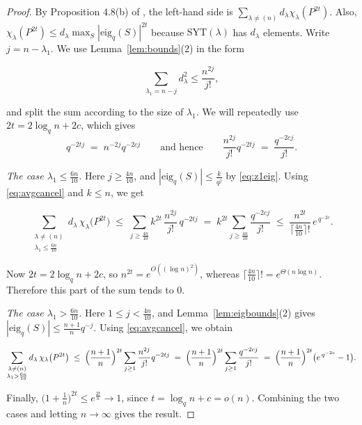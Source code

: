 \documentclass[11pt]{article}
\theoremstyle{plain}  %
\newcommand{\eig}{\text{eig}} %
\begin{document}
\begin{proof}
By Proposition 4.8(b) of \cite{DiaconisRam2000}, the left-hand side is
$\sum_{\lambda \ne (n)} d_\lambda \chi_\lambda(P^{2t})$. Also,
$\chi_\lambda(P^{2t}) \le d_\lambda \max_S |\eig_q(S)|^{2t}$ because
$\mathrm{SYT}(\lambda)$ has $d_\lambda$ elements. Write $j = n-\lambda_1$.
We use Lemma~\ref{lem:bounds}(2) in the form

$$\sum_{\lambda_1 = n-j} d_\lambda^{2} \le \frac{n^{2j}}{j!},
$$

and split the sum according to the size of $\lambda_1$. We will repeatedly use
$2t = 2\log_q n + 2c$, which gives
\begin{equation}\label{eq:avgcancel}
q^{-2tj} \;=\; n^{-2j}q^{-2cj}
\qquad\text{and hence}\qquad
\frac{n^{2j}}{j!}q^{-2tj} \;=\; \frac{q^{-2cj}}{j!} .
\end{equation}

\emph{The case $\lambda_1 \le \frac{6n}{10}$.} Here $j \ge \frac{4n}{10}$, and
$|\eig_q(S)| \le \frac{k}{q^{j}}$ by \eqref{eq:z1eig}. Using \eqref{eq:avgcancel}
and $k \le n$, we get

$$
  \sum_{\substack{\lambda \ne (n) \\ \lambda_1 \le \frac{6n}{10}}}
  d_\lambda\,\chi_\lambda\bigl(P^{2t}\bigr)
  \;\le\; \sum_{j \ge \frac{4n}{10}} k^{2t}\,\frac{n^{2j}}{j!}\,q^{-2tj}
  \;=\; k^{2t}\sum_{j \ge \frac{4n}{10}} \frac{q^{-2cj}}{j!}
  \;\le\; \frac{n^{2t}}{\lceil \frac{4n}{10}\rceil!}\,e^{\,q^{-2c}} .
$$

Now $2t = 2\log_q n + 2c$, so $n^{2t} = e^{O((\log n)^{2})}$, whereas
$\lceil \frac{4n}{10}\rceil! = e^{\Theta(n\log n)}$. Therefore this part of the sum tends to $0$.

\emph{The case $\lambda_1 > \frac{6n}{10}$.} Here $1 \le j < \frac{4n}{10}$,
and Lemma~\ref{lem:eigbounds}(2) gives $|\eig_q(S)| \le \frac{n+1}{n}q^{-j}$.
Using \eqref{eq:avgcancel}, we obtain

$$
  \sum_{\substack{\lambda \ne (n) \\ \lambda_1 > \frac{6n}{10}}}
  d_\lambda\,\chi_\lambda\bigl(P^{2t}\bigr)
  \;\le\; \Bigl(\frac{n+1}{n}\Bigr)^{2t}\sum_{j \ge 1}\frac{n^{2j}}{j!}q^{-2tj}
  \;=\; \Bigl(\frac{n+1}{n}\Bigr)^{2t}\sum_{j \ge 1}\frac{q^{-2cj}}{j!}
  \;=\; \Bigl(\frac{n+1}{n}\Bigr)^{2t}\bigl(e^{\,q^{-2c}}-1\bigr).
$$

Finally, $\bigl(1+\frac1n\bigr)^{2t} \le e^{\frac{2t}{n}} \to 1$, since
$t = \log_q n + c = o(n)$. Combining the two cases and letting $n \to \infty$
gives the result.
\end{proof}
\end{document}
